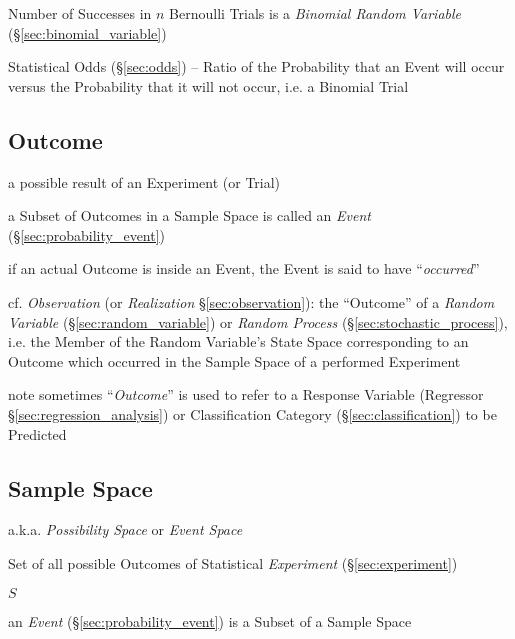 Number of Successes in $n$ Bernoulli Trials is a \emph{Binomial Random
  Variable} (\S\ref{sec:binomial_variable})

\fist Statistical Odds (\S\ref{sec:odds}) -- Ratio of the Probability that an
Event will occur versus the Probability that it will not occur, i.e. a Binomial
Trial



\subsection{Outcome}\label{sec:outcome}

a possible result of an Experiment (or Trial)

a Subset of Outcomes in a Sample Space is called an \emph{Event}
(\S\ref{sec:probability_event})

if an actual Outcome is inside an Event, the Event is said to have
``\emph{occurred}''

\fist cf. \emph{Observation} (or \emph{Realization} \S\ref{sec:observation}):
the ``Outcome'' of a \emph{Random Variable} (\S\ref{sec:random_variable}) or
\emph{Random Process} (\S\ref{sec:stochastic_process}), i.e. the Member of the
Random Variable's State Space corresponding to an Outcome which occurred in the
Sample Space of a performed Experiment

\fist note sometimes ``\emph{Outcome}'' is used to refer to a Response Variable
(Regressor \S\ref{sec:regression_analysis}) or Classification Category
(\S\ref{sec:classification}) to be Predicted



\subsection{Sample Space}\label{sec:sample_space}

a.k.a. \emph{Possibility Space} or \emph{Event Space}

Set of all possible Outcomes of Statistical \emph{Experiment}
(\S\ref{sec:experiment})

$S$

an \emph{Event} (\S\ref{sec:probability_event}) is a Subset of a Sample Space

